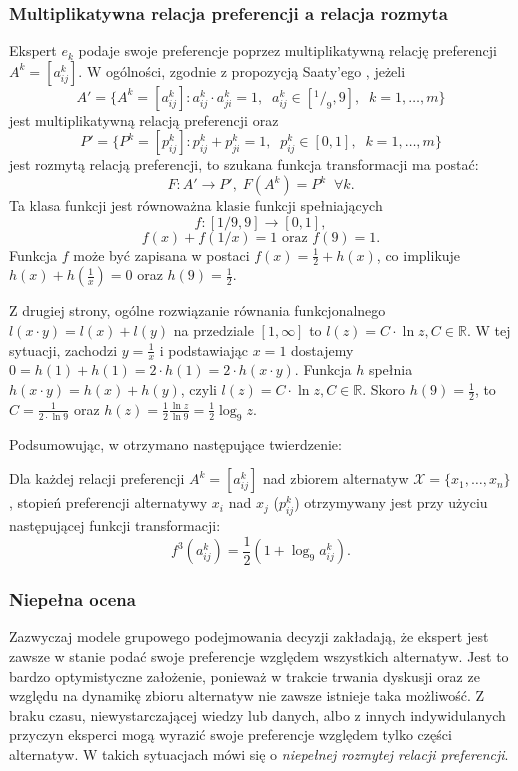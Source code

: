 \subsubsection{Multiplikatywna relacja preferencji a relacja rozmyta}
Ekspert $e_k$ podaje swoje preferencje poprzez multiplikatywną relację
preferencji $A^k = [a^k_{ij}]$. W ogólności, zgodnie z propozycją Saaty'ego
\cite{Saaty2000}, jeżeli
$$A' = \{ A^k = [a^k_{ij}] : a^k_{ij} \cdot a^k_{ji} = 1,\;\; a^k_{ij} \in
[^1/_9,9],\;\; k= 1, \dotsc, m \}$$ 
jest multiplikatywną relacją preferencji oraz
$$P' = \{ P^k = [p^k_{ij}] : p^k_{ij} + p^k_{ji} = 1,\;\; p^k_{ij} \in
[0,1],\;\; k= 1, \dotsc, m \}$$
jest rozmytą relacją preferencji, to szukana funkcja transformacji ma postać:
$$F : A' \rightarrow P',\; F(A^k) = P^k \;\; \forall k.$$ 
Ta klasa funkcji jest równoważna klasie funkcji spełniających
$$f : [1/9, 9] \rightarrow [0,1],$$
$$ f(x)+f(1/x)=1 \text{ oraz } f(9)=1.$$
Funkcja $f$ może być zapisana w postaci $f(x) = \frac{1}{2} + h(x)$, co
implikuje $h(x) + h(\frac{1}{x}) = 0 $ oraz $h(9) = \frac{1}{2}.$

Z drugiej strony, ogólne rozwiązanie równania funkcjonalnego $l(x \cdot y) =
l(x) + l(y)$ na przedziale $[1, \infty]$ to $l(z) = C \cdot \ln z, C \in
\mathbb{R}.$
W tej sytuacji, zachodzi $y = \frac{1}{x}$ i podstawiając $x = 1$ dostajemy $0
= h(1) + h(1) = 2 \cdot h(1) = 2 \cdot h(x \cdot y).$ Funkcja $h$ spełnia
$h(x \cdot y) = h(x) + h(y)$, czyli $l(z) = C \cdot \ln z, C \in \mathbb{R}.$
Skoro $h(9) = \frac{1}{2}$, to $C = \frac{1}{2 \cdot \ln 9}$ oraz $h(z) =
\frac{1}{2} \frac{\ln z}{\ln 9} = \frac{1}{2} \log_9 z.$

Podsumowując, w \cite{Chiclana1996} otrzymano następujące twierdzenie:
\begin{theorem}
Dla każdej relacji preferencji $A^k = [a^k_{ij}]$ nad zbiorem alternatyw
$\mathcal{X} = \{x_1,\dotsc,x_n\}$, stopień preferencji alternatywy $x_i$ nad
$x_j$ ($p^k_{ij}$) otrzymywany jest przy użyciu następującej funkcji
transformacji:
\begin{equation}
f^3(a^k_{ij}) = \frac{1}{2}(1 + \log_9 a^k_{ij}).
\end{equation}
\end{theorem}

\subsubsection{Niepełna ocena}
Zazwyczaj modele grupowego podejmowania decyzji zakładają, że ekspert jest
zawsze w stanie podać swoje preferencje względem wszystkich alternatyw. Jest to
bardzo optymistyczne założenie, ponieważ w trakcie trwania dyskusji oraz ze
względu na dynamikę zbioru alternatyw nie zawsze istnieje taka możliwość. Z
braku czasu, niewystarczającej wiedzy lub danych, albo z innych indywidulanych
przyczyn eksperci mogą wyrazić swoje preferencje względem tylko części
alternatyw. W takich sytuacjach mówi się o \emph{niepełnej rozmytej relacji
preferencji}.

